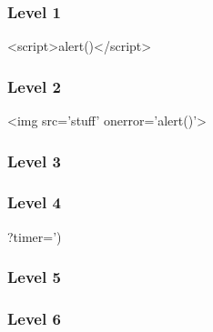 \begin{Answer}[ref={websec-xss-game}]
	\subsubsection{Level 1}
	<script>alert()</script>
	\subsubsection{Level 2}
	<img src='stuff' onerror='alert()'>
	\subsubsection{Level 3}
	\subsubsection{Level 4}
	?timer=')%
	\subsubsection{Level 5}
	\subsubsection{Level 6}
\end{Answer}